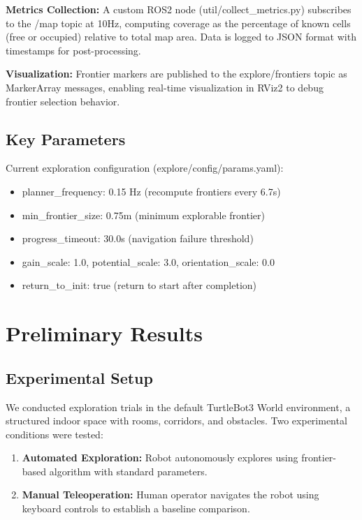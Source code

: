 \documentclass[conference]{IEEEtran}
\begin{document}
\textbf{Metrics Collection:} A custom ROS2 node (util/collect\_metrics.py) subscribes to the /map topic at 10Hz, computing coverage as the percentage of known cells (free or occupied) relative to total map area. Data is logged to JSON format with timestamps for post-processing.

\textbf{Visualization:} Frontier markers are published to the explore/frontiers topic as MarkerArray messages, enabling real-time visualization in RViz2 to debug frontier selection behavior.

\subsection{Key Parameters}

Current exploration configuration (explore/config/params.yaml):
\begin{itemize}
    \item planner\_frequency: 0.15 Hz (recompute frontiers every 6.7s)
    \item min\_frontier\_size: 0.75m (minimum explorable frontier)
    \item progress\_timeout: 30.0s (navigation failure threshold)
    \item gain\_scale: 1.0, potential\_scale: 3.0, orientation\_scale: 0.0
    \item return\_to\_init: true (return to start after completion)
\end{itemize}

\section{Preliminary Results}

\subsection{Experimental Setup}

We conducted exploration trials in the default TurtleBot3 World environment, a structured indoor space with rooms, corridors, and obstacles. Two experimental conditions were tested:

\begin{enumerate}
    \item \textbf{Automated Exploration:} Robot autonomously explores using frontier-based algorithm with standard parameters.
    \item \textbf{Manual Teleoperation:} Human operator navigates the robot using keyboard controls to establish a baseline comparison.
\end{enumerate}
\end{document}

